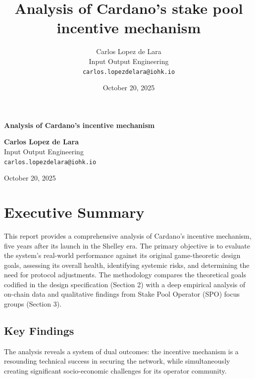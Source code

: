 \documentclass[11pt, letterpaper]{article}
\title{Analysis of Cardano's stake pool incentive mechanism}
\author{
    Carlos Lopez de Lara \\
    Input Output Engineering \\
    \texttt{carlos.lopezdelara@iohk.io}
}
\date{October 20, 2025}
\begin{document}
\begin{titlepage}
    \centering %
    
    \vfill %
    
    {\Huge \textbf{Analysis of Cardano's incentive mechanism}}
    
    \vfill 
    
    {
        \Large \textbf{Carlos Lopez de Lara} \\
        \vspace{1em} 
        \large Input Output Engineering \\
        \large \texttt{carlos.lopezdelara@iohk.io}
    }
    
    \vfill
    
    {\large October 20, 2025}
    
    \vfill 
\end{titlepage}

\thispagestyle{empty} 

\tableofcontents
\newpage
\pagestyle{fancy} 


\section*{Executive Summary}

This report provides a comprehensive analysis of Cardano's incentive mechanism, five years after its 
launch in the Shelley era. The primary objective is to evaluate the system's real-world performance 
against its original game-theoretic design goals, assessing its overall health, identifying systemic 
risks, and determining the need for protocol adjustments. The methodology compares the theoretical goals 
codified in the design specification (Section 2) with a deep empirical analysis of on-chain data and 
qualitative findings from Stake Pool Operator (SPO) focus groups (Section 3).

\subsection*{Key Findings}

The analysis reveals a system of dual outcomes: the incentive mechanism is a resounding technical 
success in securing the network, while simultaneously creating significant socio-economic challenges 
for its operator community.
\end{document}
